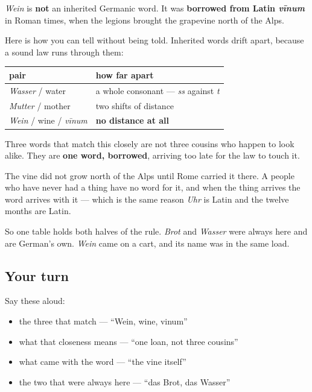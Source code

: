 \begin{cousinweb}
\emph{Wein} is \textbf{not} an inherited Germanic word. It was \textbf{borrowed from Latin \emph{vīnum}} in Roman times, when the legions brought the grapevine north of the Alps.

Here is how you can tell without being told. Inherited words drift apart, because a sound law runs through them:

\noindent
\begin{tabularx}{\linewidth}{@{}>{\raggedright\arraybackslash}X>{\raggedright\arraybackslash}X@{}}
\toprule
\textbf{pair} & \textbf{how far apart} \\
\midrule
\emph{Wasser} / water & a whole consonant — \emph{ss} against \emph{t} \\
\emph{Mutter} / mother & two shifts of distance \\
\emph{Wein} / wine / \emph{vīnum} & \textbf{no distance at all} \\
\bottomrule
\end{tabularx}

Three words that match this closely are not three cousins who happen to look alike. They are \textbf{one word, borrowed}, arriving too late for the law to touch it.
\end{cousinweb}

\begin{culture}
The vine did not grow north of the Alps until Rome carried it there. A people who have never had a thing have no word for it, and when the thing arrives the word arrives with it — which is the same reason \emph{Uhr} is Latin and the twelve months are Latin.

So one table holds both halves of the rule. \emph{Brot} and \emph{Wasser} were always here and are German's own. \emph{Wein} came on a cart, and its name was in the same load.
\end{culture}

\subsection*{Your turn}
Say these aloud:

\begin{itemize}
\raggedright
  \item the three that match — \textquotedblleft{}Wein, wine, vinum\textquotedblright{}
  \item what that closeness means — \textquotedblleft{}one loan, not three cousins\textquotedblright{}
  \item what came with the word — \textquotedblleft{}the vine itself\textquotedblright{}
  \item the two that were always here — \textquotedblleft{}das Brot, das Wasser\textquotedblright{}
\end{itemize}

